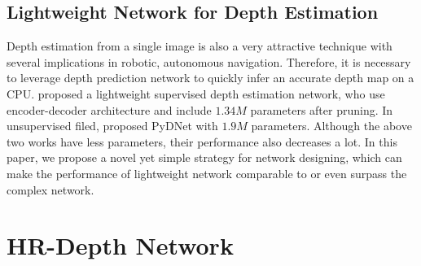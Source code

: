 \documentclass[letterpaper]{article} \usepackage{aaai21}  \usepackage{times}  \usepackage{helvet} \usepackage{courier}  \usepackage[hyphens]{url}  \usepackage{graphicx} \urlstyle{rm} \def\UrlFont{\rm}  \usepackage{natbib}  \usepackage{caption} \frenchspacing  \setlength{\pdfpagewidth}{8.5in}  \setlength{\pdfpageheight}{11in}  \usepackage{booktabs}
\begin{document}
\subsection{Lightweight Network for Depth Estimation}
Depth estimation from a single image is also a very attractive technique with several implications in robotic, autonomous navigation. Therefore, it is necessary to leverage depth prediction network to quickly infer an accurate depth map on a CPU.
\cite{wofk2019fastdepth} proposed a lightweight supervised depth estimation network, who use encoder-decoder architecture and include $1.34M$ parameters after pruning. In unsupervised filed, \cite{poggi2018towards,aleotti2020real} proposed PyDNet with $1.9M$ parameters. 
Although the above two works have less parameters, their performance also decreases a lot. In this paper, we propose a novel yet simple strategy for network designing, which can make the performance of lightweight network comparable to or even surpass the complex network.

\section{HR-Depth Network}
\end{document}
